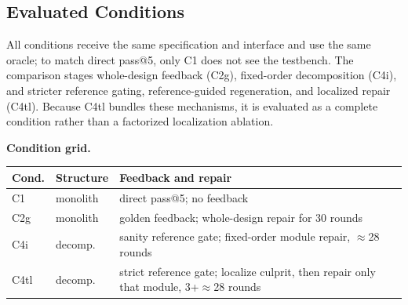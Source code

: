 \documentclass[sigconf,anonymous]{acmart}
\newcommand{\cOne}{C1\xspace}
\newcommand{\cTwoG}{C2g\xspace}
\newcommand{\cFourI}{C4i\xspace}
\newcommand{\cFourTL}{C4tl\xspace}
\begin{document}
\subsection{Evaluated Conditions}

All conditions receive the same specification and interface and use the same oracle; to match direct pass@5, only \cOne does not see the testbench.
The comparison stages whole-design feedback (\cTwoG), fixed-order decomposition (\cFourI), and stricter reference gating, reference-guided regeneration, and localized repair (\cFourTL).
Because \cFourTL bundles these mechanisms, it is evaluated as a complete condition rather than a factorized localization ablation.

\par{}
\noindent\begin{minipage}{\columnwidth}
\small
\textbf{Condition grid.}
\par{}
\centering
\setlength{\tabcolsep}{4.5pt}
\renewcommand{\arraystretch}{1.15}
\begin{tabular}{@{}lp{1.45cm}p{4.65cm}@{}}
\toprule
Cond. & Structure & Feedback and repair \\
\midrule
\cOne & monolith & direct pass@5; no feedback \\
\cTwoG & monolith & golden feedback; whole-design repair for 30 rounds \\
\cFourI & decomp. & sanity reference gate; fixed-order module repair, $\approx$28 rounds \\
\cFourTL & decomp. & strict reference gate; localize culprit, then repair only that module, 3+$\approx$28 rounds \\
\bottomrule
\end{tabular}
\renewcommand{\arraystretch}{1.0}
\end{minipage}
\par{}
\end{document}
